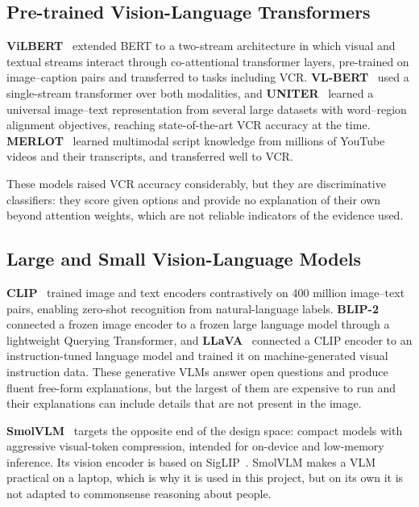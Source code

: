 \documentclass[12pt,a4paper,oneside]{report}
\begin{document}
\subsection{Pre-trained Vision-Language Transformers}

\textbf{ViLBERT}~\cite{lu2019vilbert} extended BERT to a two-stream architecture
in which visual and textual streams interact through co-attentional transformer
layers, pre-trained on image--caption pairs and transferred to tasks including
VCR. \textbf{VL-BERT}~\cite{su2020vlbert} used a single-stream transformer over
both modalities, and \textbf{UNITER}~\cite{chen2020uniter} learned a universal
image--text representation from several large datasets with word--region
alignment objectives, reaching state-of-the-art VCR accuracy at the time.
\textbf{MERLOT}~\cite{zellers2021merlot} learned multimodal script knowledge from
millions of YouTube videos and their transcripts, and transferred well to VCR.

These models raised VCR accuracy considerably, but they are discriminative
classifiers: they score given options and provide no explanation of their own
beyond attention weights, which are not reliable indicators of the evidence
used.

\subsection{Large and Small Vision-Language Models}

\textbf{CLIP}~\cite{radford2021clip} trained image and text encoders
contrastively on 400 million image--text pairs, enabling zero-shot recognition
from natural-language labels. \textbf{BLIP-2}~\cite{li2023blip2} connected a
frozen image encoder to a frozen large language model through a lightweight
Querying Transformer, and \textbf{LLaVA}~\cite{liu2023llava} connected a CLIP
encoder to an instruction-tuned language model and trained it on
machine-generated visual instruction data. These generative VLMs answer open
questions and produce fluent free-form explanations, but the largest of them are
expensive to run and their explanations can include details that are not
present in the image.

\textbf{SmolVLM}~\cite{marafioti2025smolvlm} targets the opposite end of the
design space: compact models with aggressive visual-token compression, intended
for on-device and low-memory inference. Its vision encoder is based on
SigLIP~\cite{zhai2023siglip}. SmolVLM makes a VLM practical on a laptop, which
is why it is used in this project, but on its own it is not adapted to
commonsense reasoning about people.
\end{document}
